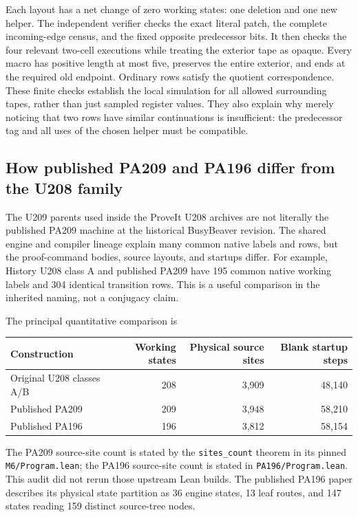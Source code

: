 Each layout has a net change of zero working states: one deletion and one
new helper.  The independent verifier checks the exact literal patch, the
complete incoming-edge census, and the fixed opposite predecessor bits.
It then checks the four relevant two-cell executions while treating the
exterior tape as opaque.  Every macro has positive length at most five,
preserves the entire exterior, and ends at the required old endpoint.
Ordinary rows satisfy the quotient correspondence.  These finite checks
establish the local simulation for all allowed surrounding tapes, rather
than just sampled register values.  They also explain why merely noticing
that two rows have similar continuations is insufficient: the predecessor
tag and all uses of the chosen helper must be compatible.

\subsection{How published PA209 and PA196 differ from the U208 family}
The U209 parents used inside the ProveIt U208 archives are not literally the
published PA209 machine at the historical BusyBeaver revision.  The shared
engine and compiler lineage explain many common native labels and rows,
but the proof-command bodies, source layouts, and startups differ.  For
example, History U208 class A and published PA209 have 195 common native
working labels and 304 identical transition rows.  This is a useful
comparison in the inherited naming, not a conjugacy claim.

The principal quantitative comparison is
\begin{center}
\begin{tabular}{@{}lrrr@{}}
\toprule
Construction&Working states&Physical source sites&Blank startup steps\\
\midrule
Original U208 classes A/B&208&3,909&48,140\\
Published PA209&209&3,948&58,210\\
Published PA196&196&3,812&58,154\\
\bottomrule
\end{tabular}
\end{center}
The PA209 source-site count is stated by the \texttt{sites\_count}
theorem in its pinned \texttt{M6/Program.lean}; the PA196 source-site count is
stated in \texttt{PA196/Program.lean}.  This audit did not rerun those upstream
Lean builds.  The published PA196 paper describes its physical
state partition as 36 engine states, 13 leaf routes, and 147 states reading
159 distinct source-tree nodes.

